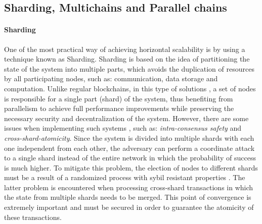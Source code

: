 


\subsection{Sharding, Multichains and Parallel chains}

\paragraph{Sharding}

One of the most practical way of achieving horizontal scalability is by using a technique known as Sharding. Sharding is based on the idea of partitioning the state of the system into multiple parts, which avoids the duplication of resources by all participating nodes, such as: communication, data storage and computation. Unlike regular blockchains, in this type of solutions \cite{sharding_survey, towards_scaling_via_sharding, elastico, omniledger, rapid_chain}, a set of nodes is responsible for a single part (shard) of the system, thus benefiting from parallelism to achieve full performance improvements while preserving the necessary security and decentralization of the system.
However, there are some issues when implementing such systems \cite{sharding_survey}, such as: \textit{intra-consensus safety} and \textit{cross-shard-atomicity}. Since the system is divided into multiple shards with each one independent from each other, the adversary can perform a coordinate attack to a single shard instead of the entire network in which the probability of success is much higher. To mitigate this problem, the election of nodes to different shards must be a result of a randomized process with sybil resistant properties \cite{sybil_attack}. The latter problem is encountered when processing cross-shard transactions in which the state from multiple shards needs to be merged. This point of convergence is extremely important and must be secured in order to guarantee the atomicity of these transactions. %


